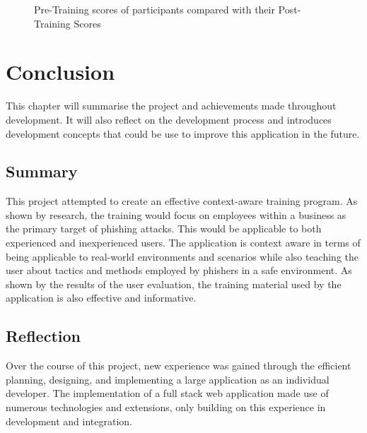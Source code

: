 \documentclass{l4proj}
\begin{document}
\begin{figure}[H]
    \centering
    \caption{Pre-Training scores of participants compared with their Post-Training Scores}
    \label{fig:ques_score_comp}
\end{figure}


\chapter{Conclusion}    

This chapter will summarise the project and achievements made throughout development. It will also reflect on the development process and introduces development concepts that could be use to improve this application in the future.

\section{Summary}
This project attempted to create an effective context-aware training program. As shown by research, the training would focus on employees within a business as the primary target of phishing attacks. This would be applicable to both experienced and inexperienced users. The application is context aware in terms of being applicable to real-world environments and scenarios while also teaching the user about tactics and methods employed by phishers in a safe environment. As shown by the results of the user evaluation, the training material used by the application is also effective and informative. 

\section{Reflection}
Over the course of this project, new experience was gained through the efficient planning, designing, and implementing a large application as an individual developer. The implementation of a full stack web application made use of numerous technologies and extensions, only building on this experience in development and integration.
\end{document}
